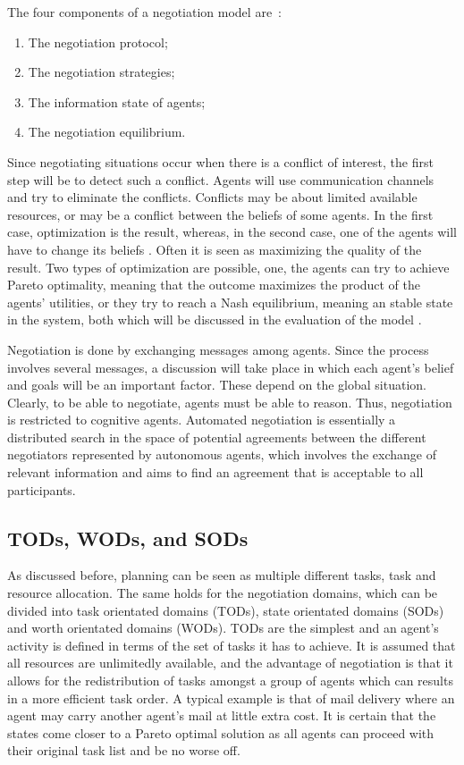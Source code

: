 The four components of a negotiation model are~\citep{fatima2004agenda}:
\begin{enumerate}
	\item The negotiation protocol;
	\item The negotiation strategies;
	\item The information state of agents;
	\item The negotiation equilibrium.
\end{enumerate}

Since negotiating situations occur when there is a conflict of interest, the first step will be to detect such a conflict. Agents will use communication channels and try to eliminate the conflicts. Conflicts may be about limited available resources, or may be a conflict between the beliefs of some agents. In the first case, optimization is the result, whereas, in the second case, one of the agents will have to change its beliefs \citep{shen2003multi}. Often it is seen as maximizing the quality of the result. Two types of optimization are possible, one, the agents can try to achieve Pareto optimality, meaning that the outcome maximizes the product of the agents' utilities, or they try to reach a Nash equilibrium, meaning an stable state in the system, both which will be discussed in the evaluation of the model .

Negotiation is done by exchanging messages among agents. Since the process involves several messages, a discussion will take place in which each agent's belief and goals will be an important factor. These depend on the global situation. Clearly, to be able to negotiate, agents must be able to reason. Thus, negotiation is restricted to cognitive agents. Automated negotiation is essentially a distributed search in the space of potential agreements between the different negotiators represented by autonomous agents, which involves the exchange of relevant information and aims to find an agreement that is acceptable to all participants.

\subsection{TODs, WODs, and SODs}

As discussed before, planning can be seen as multiple different tasks, task and resource allocation. The same holds for the negotiation domains, which can be divided into task orientated domains (TODs), state orientated domains (SODs) and worth orientated domains (WODs). TODs are the simplest and an agent's activity is defined in terms of the set of tasks it has to achieve. It is assumed that all resources are unlimitedly available, and the advantage of negotiation is that it allows for the redistribution of tasks amongst a group of agents which can results in a more efficient task order. A typical example is that of mail delivery where an agent may carry another agent's mail at little extra cost. It is certain that the states come closer to a Pareto optimal solution as all agents can proceed with their original task list and be no worse off. 

